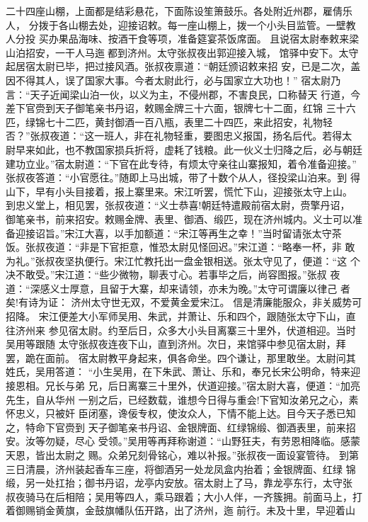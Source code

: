 二十四座山棚，上面都是结彩悬花，下面陈设笙箫鼓乐。各处附近州郡，雇倩乐人，
分拨于各山棚去处，迎接诏敕。每一座山棚上，拨一个小头目监管。一壁教人分投
买办果品海味、按酒干食等项，准备筵宴茶饭席面。
且说宿太尉奉敕来梁山泊招安，一干人马迤都到济州。太守张叔夜出郭迎接入城，
馆驿中安下。太守起居宿太尉已毕，把过接风酒。张叔夜禀道：“朝廷颁诏敕来招
安，已是二次，盖因不得其人，误了国家大事。今者太尉此行，必与国家立大功也！”
宿太尉乃言：“天子近闻梁山泊一伙，以义为主，不侵州郡，不害良民，口称替天
行道，今差下官赍到天子御笔亲书丹诏，敕赐金牌三十六面，银牌七十二面，红锦
三十六匹，绿锦七十二匹，黄封御酒一百八瓶，表里二十四匹，来此招安，礼物轻
否？”张叔夜道：“这一班人，非在礼物轻重，要图忠义报国，扬名后代。若得太
尉早来如此，也不教国家损兵折将，虚耗了钱粮。此一伙义士归降之后，必与朝廷
建功立业。”宿太尉道：“下官在此专待，有烦太守亲往山寨报知，着令准备迎接。”
张叔夜答道：“小官愿往。”随即上马出城，带了十数个从人，径投梁山泊来。到
得山下，早有小头目接着，报上寨里来。宋江听罢，慌忙下山，迎接张太守上山。
到忠义堂上，相见罢，张叔夜道：“义士恭喜!朝廷特遣殿前宿太尉，赍擎丹诏，
御笔亲书，前来招安。敕赐金牌、表里、御酒、缎匹，现在济州城内。义士可以准
备迎接诏旨。”宋江大喜，以手加额道：“宋江等再生之幸！”当时留请张太守茶
饭。张叔夜道：“非是下官拒意，惟恐太尉见怪回迟。”宋江道：“略奉一杯，非
敢为礼。”张叔夜坚执便行。宋江忙教托出一盘金银相送。张太守见了，便道：“这
个决不敢受。”宋江道：“些少微物，聊表寸心。若事毕之后，尚容图报。”张叔
夜道：“深感义士厚意，且留于大寨，却来请领，亦未为晚。”太守可谓廉以律己
者矣!有诗为证：
济州太守世无双，不爱黄金爱宋江。
信是清廉能服众，非关威势可招降。
宋江便差大小军师吴用、朱武，并萧让、乐和四个，跟随张太守下山，直往济州来
参见宿太尉。约至后日，众多大小头目离寨三十里外，伏道相迎。当时吴用等跟随
太守张叔夜连夜下山，直到济州。次日，来馆驿中参见宿太尉，拜罢，跪在面前。
宿太尉教平身起来，俱各命坐。四个谦让，那里敢坐。太尉问其姓氏，吴用答道：
“小生吴用，在下朱武、萧让、乐和，奉兄长宋公明命，特来迎接恩相。兄长与弟
兄，后日离寨三十里外，伏道迎接。”宿太尉大喜，便道：“加亮先生，自从华州
一别之后，已经数载，谁想今日得与重会!下官知汝弟兄之心，素怀忠义，只被奸
臣闭塞，谗佞专权，使汝众人，下情不能上达。目今天子悉已知之，特命下官赍到
天子御笔亲书丹诏、金银牌面、红绿锦缎、御酒表里，前来招安。汝等勿疑，尽心
受领。”吴用等再拜称谢道：“山野狂夫，有劳恩相降临。感蒙天恩，皆出太尉之
赐。众弟兄刻骨铭心，难以补报。”张叔夜一面设宴管待。
到第三日清晨，济州装起香车三座，将御酒另一处龙凤盒内抬着；金银牌面、红绿
锦缎，另一处扛抬；御书丹诏，龙亭内安放。宿太尉上了马，靠龙亭东行，太守张
叔夜骑马在后相陪；吴用等四人，乘马跟着；大小人伴，一齐簇拥。前面马上，打
着御赐销金黄旗，金鼓旗幡队伍开路，出了济州，迤前行。未及十里，早迎着山
